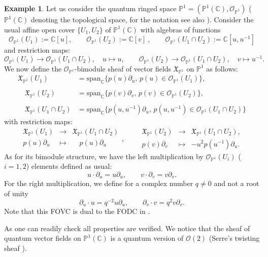 \documentclass{article}
\theoremstyle{definition}
\newtheorem{example}[thm]{Example}
\newcommand{\cO}{{\mathcal{O}}}
\newcommand{\C}{{\mathbb{C}}}
\newcommand{\bP}{{\mathbb{P}}}
\newcommand{\lra}{{\longrightarrow}}
\newcommand{\Chi}{{\mathfrak{X}}}
\newcommand{\beq}{\begin{equation}}
\newcommand{\eeq}{\end{equation}}
\begin{document}
\begin{example}
Let us consider the quantum ringed space $\bP^1= (\bP^1(\C),\cO_{\bP^1})$
($\bP^1(\C)$ denoting the topological space,
for the notation see also \cite[Section 2]{afl}).
Consider the usual affine open cover
$\{U_1,U_2\}$ of $\bP^1(\C)$  
with algebras of functions
$$
\cO_{\bP^1}(U_1):= 
\C[u], \qquad \cO_{\bP^1}(U_2):= 
\C[v]~, \qquad \cO_{\bP^1}(U_1 \cap U_2):=\C[u,u^{-1}]
$$
and restriction maps:
$$
\cO_{\bP^1}(U_1) \lra \cO_{\bP^1}(U_1 \cap U_2), \quad u \mapsto u, \qquad
\cO_{\bP^1}(U_2) \lra \cO_{\bP^1}(U_1 \cap U_2), \quad v\mapsto  u^{-1}. \qquad
$$
We now define the $\cO_{\bP^1}$-bimodule sheaf of vector fields $\Chi_{\bP^1}$ on $\bP^1$
as follows:
\beq
\begin{array}{rl}
	\Chi_{\bP^1}(U_1)&=\mathrm{span}_\C\{p(u)\partial_u, \, p(u) \in \cO_{\bP^1}(U_1)\}, \\ \\
	\quad \Chi_{\bP^1}(U_2)&=\mathrm{span}_\C\{p(v)\partial_v, \, p(v) \in \cO_{\bP^1}(U_2)\}, \\ \\
	\quad \Chi_{\bP^1}(U_1 \cap U_2)&=\mathrm{span}_\C\{p(u,u^{-1})\partial_u, \, p(u,u^{-1}) \in \cO_{\bP^1}(U_1 \cap U_2)\}
\end{array}
\eeq
with restriction maps:
$$
\begin{array}{ccc}
	\Chi_{\bP^1}(U_1) & \lra &\Chi_{\bP^1}(U_1 \cap U_2)\\
	p(u)\partial_u & \mapsto &\quad p(u)\partial_u\\
\end{array},
\qquad
\begin{array}{ccc}
	\Chi_{\bP^1}(U_2)  & \lra  & \Chi_{\bP^1} (U_1 \cap U_2), \\
	p(v)\partial_v  & \mapsto  &- u^2p(u^{-1})\partial_u.
\end{array}
$$
As for its bimodule structure, we have the left multiplication by $\cO_{\bP^1}(U_i)$ ($i=1,2$)
elements defined as usual:
$$
u \cdot \partial_u = u\partial_u, \qquad v \cdot \partial_v = v\partial_v.
$$
For the right multiplication, 
we define for a complex number $q\neq 0$ and not a root of unity
$$
\partial_u \cdot u = q^{-2} u \partial_u, \qquad \partial_v \cdot v = q^{2} v \partial_v.
$$
Note that this FOVC is dual to the FODC in \cite[Proposition 4.19]{aflw}.


As one can readily check all properties are verified. We notice that
the sheaf of quantum vector fields on $\bP^1(\C)$ is a quantum version of $\cO(2)$
(Serre's twisting sheaf \cite[Chapter 2]{ha}).
\end{example}
\end{document}
